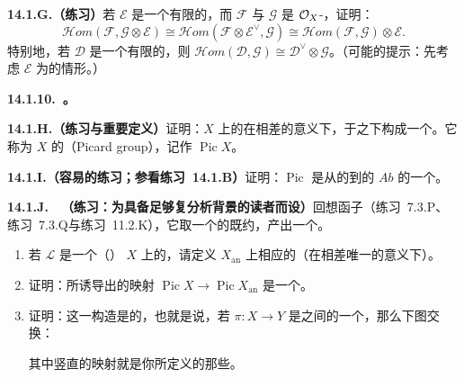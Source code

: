 \textbf{14.1.G.（练习）}\quad 若 $\mathscr{E}$ 是一个有限\trRank{}的\trLocallyFreeSheaf，而 $\mathscr{F}$ 与 $\mathscr{G}$ 是 $\mathcal{O}_X$-\trModule，证明：
\[
\mathscr{H}om(\mathscr{F},\mathscr{G}\otimes\mathscr{E})
\cong\mathscr{H}om(\mathscr{F}\otimes\mathscr{E}^{\vee},\mathscr{G})
\cong\mathscr{H}om(\mathscr{F},\mathscr{G})\otimes\mathscr{E}.
\]
特别地，若 $\mathscr{D}$ 是一个有限\trRank{}的\trLocallyFreeSheaf，则 $\mathscr{H}om(\mathscr{D},\mathscr{G})\cong\mathscr{D}^{\vee}\otimes\mathscr{G}$。（可能的提示：先考虑 $\mathscr{E}$ 为\trFreeSheaf{}的情形。）

\textbf{14.1.10.\ \trPicardGroup。}

\textbf{14.1.H.（练习与重要定义）}\quad 证明：$X$ 上的\trInvertibleSheaf{}在相差\trIsomorphism{}的意义下，于\trTensorProduct{}之下构成一个\trAbelianGroups。它称为 $X$ 的\textbf{\trPicardGroup}（Picard group），记作 $\operatorname{Pic} X$。

\textbf{14.1.I.（容易的练习；参看\mbox{练习~14.1.B}）}\quad 证明：$\operatorname{Pic}$ 是从\trRingedSpace{}的\trCategory{}到\trAbelianGroups{}的\trCategory{} $Ab$ 的一个\trContravariantFunctor。

\textbf{14.1.J.}\ \hard\ \textbf{（练习：为具备足够复分析背景的读者而设）}\quad 回想\trAnalytification{}函子（\mbox{练习~7.3.P}、\mbox{练习~7.3.Q}与\mbox{练习~11.2.K}），它取一个\trComplex{}的\trFiniteType{}既约\trScheme{}，产出一个\trComplexAnalyticSpace。
\begin{enumerate}[label=(\alph*)]
\item 若 $\mathscr{L}$ 是一个\trComplex{}（\trAlgebraic）\trVariety{} $X$ 上的\trInvertibleSheaf，请定义\trComplex{}\trVariety{} $X_{\mathrm{an}}$ 上相应的\trInvertibleSheaf（在相差唯一\trIsomorphism{}的意义下）。
\item 证明：所诱导出的映射 $\operatorname{Pic}X\to\operatorname{Pic}X_{\mathrm{an}}$ 是一个\trGroupHom。
\item 证明：这一构造是\trFunctoriality{}的，也就是说，若 $\pi\colon X\to Y$ 是\trComplex{}\trVariety{}之间的一个\trMorphism，那么下图交换：
\begin{center}
\end{center}
其中竖直的映射就是你所定义的那些。
\end{enumerate}


